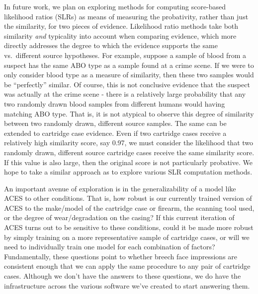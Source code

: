 \documentclass[11pt,]{isuthesis}
\begin{document}
In future work, we plan on exploring methods for computing score-based likelihood ratios (SLRs) as means of measuring the probativity, rather than just the similarity, for two pieces of evidence.
Likelihood ratio methods take both similarity \emph{and} typicality \citep{Morrison2018} into account when comparing evidence, which more directly addresses the degree to which the evidence supports the same vs.~different source hypotheses.
For example, suppose a sample of blood from a suspect has the same ABO type as a sample found at a crime scene.
If we were to only consider blood type as a measure of similarity, then these two samples would be ``perfectly'' similar.
Of course, this is not conclusive evidence that the suspect was actually at the crime scene - there is a relatively large probability that any two randomly drawn blood samples from different humans would having matching ABO type.
That is, it is not atypical to observe this degree of similarity between two randomly drawn, different source samples.
The same can be extended to cartridge case evidence.
Even if two cartridge cases receive a relatively high similarity score, say 0.97, we must consider the likelihood that two randomly drawn, different source cartridge cases receive the same similarity score.
If this value is also large, then the original score is not particularly probative.
We hope to take a similar approach as \citet{Reinders2022} to explore various SLR computation methods.

An important avenue of exploration is in the generalizability of a model like ACES to other conditions.
That is, how robust is our currently trained version of ACES to the make/model of the cartridge case or firearm, the scanning tool used, or the degree of wear/degradation on the casing?
If this current iteration of ACES turns out to be sensitive to these conditions, could it be made more robust by simply training on a more representative sample of cartridge cases, or will we need to individually train one model for each combination of factors?
Fundamentally, these questions point to whether breech face impressions are consistent enough that we can apply the same procedure to any pair of cartridge cases.
Although we don't have the answers to these questions, we do have the infrastructure across the various software we've created to start answering them.
\end{document}
